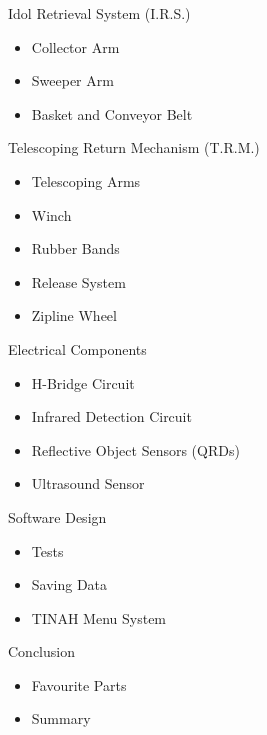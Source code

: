 \documentclass[aspectratio=1610]{beamer}
\begin{document}
\begin{frame}{Idol Retrieval System (I.R.S.)}
  \begin{itemize}
    \item Collector Arm
    \item Sweeper Arm
    \item Basket and Conveyor Belt
  \end{itemize}
\end{frame}

\begin{frame}{Telescoping Return Mechanism (T.R.M.)}
  \begin{itemize}
    \item Telescoping Arms
    \item Winch
    \item Rubber Bands
    \item Release System
    \item Zipline Wheel
  \end{itemize}
\end{frame}

\begin{frame}{Electrical Components}
  \begin{itemize}
    \item H-Bridge Circuit
    \item Infrared Detection Circuit
    \item Reflective Object Sensors (QRDs)
    \item Ultrasound Sensor
  \end{itemize}
\end{frame}

\begin{frame}{Software Design}
  \begin{itemize}
    \item Tests
    \item Saving Data
    \item TINAH Menu System
  \end{itemize}
\end{frame}

\begin{frame}{Conclusion}
  \begin{itemize}
    \item Favourite Parts
    \item Summary
  \end{itemize}
\end{frame}
\end{document}
